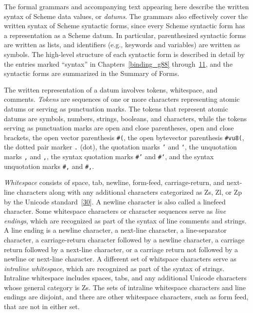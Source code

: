 
\label{grammar_h0}




\label{grammar_s0}The formal grammars and accompanying text appearing here describe the
written syntax of Scheme data values, or \textit{datums}.
The grammars also effectively cover the written syntax of Scheme syntactic
forms, since every Scheme syntactic form has a representation as a Scheme
datum.
In particular, parenthesized syntactic forms are written
as lists, and identifiers (e.g., keywords and variables) are written
as symbols.
The high-level structure of each syntactic form is described in detail by
the entries marked ``syntax'' in Chapters \ref{binding_g88}
through \hyperref[exceptions_g147]{11}, and the syntactic forms are summarized in
the Summary of Forms.


\label{grammar_s1}The written representation of a datum involves tokens, whitespace, and comments.
\textit{Tokens} are sequences of one or more characters representing atomic
datums or serving as punctuation marks.
The tokens that represent atomic datums are symbols, numbers, strings,
booleans, and characters, while the tokens
serving as punctuation marks are
open and close parentheses, open and close brackets, the open vector
parenthesis \texttt{\#{}(}, the open bytevector parenthesis \texttt{\#{}vu8(},
the dotted pair marker \texttt{.} (dot), the quotation marks
\texttt{'} and \texttt{`}, the
unquotation marks \texttt{,} and \texttt{,\@{}}, the
syntax quotation marks 
\texttt{\#{}'} and \texttt{\#{}`}, and the syntax
unquotation marks \texttt{\#{},} and \texttt{\#{},\@{}}.


\label{grammar_s2}\label{grammar_s3}\label{grammar_s4}\textit{Whitespace} consists of space, tab, newline, form-feed,
carriage-return, and next-line characters along with any additional
characters categorized as Zs, Zl, or Zp by the Unicode
standard [\hyperref[bibliography_g248]{30}].
A newline character is also called a linefeed character.
Some whitespace characters or character sequences serve as \textit{line endings},
which are recognized as part of the syntax of line comments and strings.
A line ending is a newline character, a next-line character,
a line-separator character, a carriage-return character followed by a
newline character, a carriage return followed by a next-line
character, or a carriage return not followed by a newline
or next-line character.
A different set of whitspace characters serve as \textit{intraline whitespace},
which are recognized as part of the syntax of strings.
Intraline whitespace includes spaces, tabs, and any additional Unicode
characters whose general category is Zs.
The sets of intraline whitespace characters and line endings are disjoint,
and there are other whitespace characters, such as form feed, that are
not in either set.


